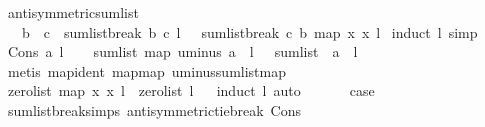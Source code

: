 \begin{isabellebody}
\isamarkupfalse%
\ antisymmetric{\isacharunderscore}{\kern0pt}sumlist{\isacharcolon}{\kern0pt}\isanewline
\ \ \ {\isachardoublequoteopen}b\ {\isasymnoteq}\ c\ {\isasymLongrightarrow}\ sumlist{\isacharunderscore}{\kern0pt}break\ b\ c\ l\ {\isacharequal}{\kern0pt}\ {\isacharminus}{\kern0pt}\ sumlist{\isacharunderscore}{\kern0pt}break\ c\ b\ {\isacharparenleft}{\kern0pt}map\ {\isacharparenleft}{\kern0pt}{\isasymlambda}x{\isachardot}{\kern0pt}\ {\isacharminus}{\kern0pt}x{\isacharparenright}{\kern0pt}\ l{\isacharparenright}{\kern0pt}\ {\isachardoublequoteclose}\isanewline
%
\isadelimproof
%
\endisadelimproof
%
\isatagproof
{}\isamarkupfalse%
{\isacharparenleft}{\kern0pt}induct\ l{\isacharcomma}{\kern0pt}\ simp{\isacharparenright}{\kern0pt}\isanewline
\ \ \isamarkupfalse%
\ {\isacharparenleft}{\kern0pt}Cons\ a\ l{\isacharparenright}{\kern0pt}\isanewline
\ \ \isamarkupfalse%
\ {\isachardoublequoteopen}sum{\isacharunderscore}{\kern0pt}list\ {\isacharparenleft}{\kern0pt}map\ uminus\ {\isacharparenleft}{\kern0pt}a\ {\isacharhash}{\kern0pt}\ l{\isacharparenright}{\kern0pt}{\isacharparenright}{\kern0pt}\ {\isacharequal}{\kern0pt}\ {\isacharminus}{\kern0pt}\ sum{\isacharunderscore}{\kern0pt}list\ \ {\isacharparenleft}{\kern0pt}a\ {\isacharhash}{\kern0pt}\ l{\isacharparenright}{\kern0pt}{\isachardoublequoteclose}\isanewline
\ \ \ \ \isamarkupfalse%
\ {\isacharparenleft}{\kern0pt}metis\ map{\isacharunderscore}{\kern0pt}ident\ map{\isacharunderscore}{\kern0pt}map\ uminus{\isacharunderscore}{\kern0pt}sum{\isacharunderscore}{\kern0pt}list{\isacharunderscore}{\kern0pt}map{\isacharparenright}{\kern0pt}\ \isanewline
\ \ \isamarkupfalse%
\ \isamarkupfalse%
\ {\isachardoublequoteopen}zero{\isacharunderscore}{\kern0pt}list\ {\isacharparenleft}{\kern0pt}map\ {\isacharparenleft}{\kern0pt}{\isasymlambda}x{\isachardot}{\kern0pt}\ {\isacharminus}{\kern0pt}x{\isacharparenright}{\kern0pt}\ l{\isacharparenright}{\kern0pt}\ {\isasymequiv}\ zero{\isacharunderscore}{\kern0pt}list\ l{\isachardoublequoteclose}\isanewline
\ \ \isamarkupfalse%
{\isacharparenleft}{\kern0pt}induct\ l{\isacharcomma}{\kern0pt}\ auto{\isacharparenright}{\kern0pt}\ \isamarkupfalse%
\isanewline
\ \ \isamarkupfalse%
\ \isamarkupfalse%
\ {\isacharquery}{\kern0pt}case\ \isamarkupfalse%
\ sumlist{\isacharunderscore}{\kern0pt}break{\isachardot}{\kern0pt}simps\ antisymmetric{\isacharunderscore}{\kern0pt}tie{\isacharunderscore}{\kern0pt}break\ Cons\ \isamarkupfalse%

\end{isabellebody}
